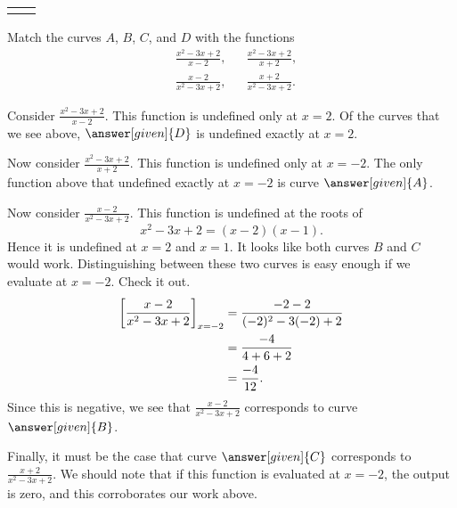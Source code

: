 \documentclass{ximera}
\begin{document}
\begin{example}
\begin{image}
\begin{tabular}{cc}
\begin{tikzpicture}
\begin{axis}
      \end{axis}
    \end{tikzpicture}
  \end{tabular}
\end{image}
Match the curves $A$, $B$, $C$, and $D$ with the functions
  \begin{align*}
    &\frac{x^2-3x+2}{x-2}, &&\frac{x^2-3x+2}{x+2}, \\
    &\frac{x-2}{x^2-3x+2}, &&\frac{x+2}{x^2-3x+2}.
  \end{align*}
\begin{explanation}
  Consider $\frac{x^2-3x+2}{x-2}$. This function is undefined only at
  $x=2$. Of the curves that we see above, $\answer[given]{D}$ is
  undefined exactly at $x=2$.

  Now consider $\frac{x^2-3x+2}{x+2}$. This function is undefined only
  at $x=-2$. The only function above that undefined exactly at $x=-2$
  is curve $\answer[given]{A}$.

  Now consider $\frac{x-2}{x^2-3x+2}$. This function is undefined at
  the roots of
  \[
  x^2-3x+2 = (x-2)(x-1).
  \]
  Hence it is undefined at $x=2$ and $x=1$. It looks like both curves
  $B$ and $C$ would work. Distinguishing between these two curves is
  easy enough if we evaluate at $x=-2$. Check it out.
  \begin{align*}
    \bigg[ \frac{x-2}{x^2-3x+2} \bigg]_{x=-2} &= \frac{-2-2}{(-2)^2-3(-2)+2}\\
    &= \frac{-4}{4+6+2}\\
    &=\frac{-4}{12}.
  \end{align*}
  Since this is negative, we see that $\frac{x-2}{x^2-3x+2}$
  corresponds to curve $\answer[given]{B}$.

  Finally, it must be the case that curve $\answer[given]{C}$
  corresponds to $\frac{x+2}{x^2-3x+2}$. We should note that if this
  function is evaluated at $x=-2$, the output is zero, and this
  corroborates our work above.
\end{explanation}
\end{example}
\end{document}
